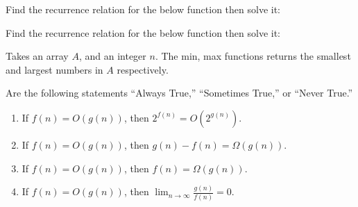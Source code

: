 \vspace{-.5em}
\begin{Exercise} Find the recurrence relation for the below function then solve it:
\end{Exercise}

\vspace{-.5em}
\begin{Func}

    \vspace{-1em}
    \begin{algorithm}[H]
    \end{algorithm}
\end{Func}

\vspace{-.5em}
\begin{Exercise} Find the recurrence relation for the below function then solve it:
\end{Exercise}

\vspace{-.5em}
\begin{Func}

    \vspace{-1em}
    Takes an array $A$, and an integer $n$. The min, max functions
    returns the smallest and largest numbers in $A$ respectively.\\
    \begin{algorithm}[H]
    \end{algorithm}
\end{Func}

\newpage 

\begin{Exercise} Are the following statements ``Always True,'' ``Sometimes True,'' or ``Never True.''
    
    \begin{enumerate}
        \item If \(f(n) = O(g(n))\), then \(2^{f(n)} = O(2^{g(n)})\).
        \item If \(f(n) = O(g(n))\), then \(g(n) - f(n) = \Omega(g(n))\).
        \item If \(f(n) = O(g(n))\), then \(f(n) = \Omega(g(n))\).
        \item If \(f(n) = O(g(n))\), then \(\lim_{n \to \infty} \frac{g(n)}{f(n)} = 0\).
    \end{enumerate}
    
\end{Exercise}

